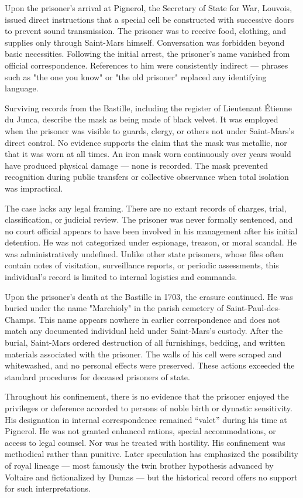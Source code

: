 Upon the prisoner's arrival at Pignerol, the Secretary of State for War, Louvois, issued direct instructions that a special cell be constructed with successive doors to prevent sound transmission. The prisoner was to receive food, clothing, and supplies only through Saint-Mars himself. Conversation was forbidden beyond basic necessities. Following the initial arrest, the prisoner's name vanished from official correspondence. References to him were consistently indirect — phrases such as "the one you know" or "the old prisoner" replaced any identifying language.

Surviving records from the Bastille, including the register of Lieutenant Étienne du Junca, describe the mask as being made of black velvet. It was employed when the prisoner was visible to guards, clergy, or others not under Saint-Mars's direct control. No evidence supports the claim that the mask was metallic, nor that it was worn at all times. An iron mask worn continuously over years would have produced physical damage — none is recorded. The mask prevented recognition during public transfers or collective observance when total isolation was impractical.

The case lacks any legal framing. There are no extant records of charges, trial, classification, or judicial review. The prisoner was never formally sentenced, and no court official appears to have been involved in his management after his initial detention. He was not categorized under espionage, treason, or moral scandal. He was administratively undefined. Unlike other state prisoners, whose files often contain notes of visitation, surveillance reports, or periodic assessments, this individual's record is limited to internal logistics and commands.

Upon the prisoner's death at the Bastille in 1703, the erasure continued. He was buried under the name "Marchioly" in the parish cemetery of Saint-Paul-des-Champs. This name appears nowhere in earlier correspondence and does not match any documented individual held under Saint-Mars's custody. After the burial, Saint-Mars ordered destruction of all furnishings, bedding, and written materials associated with the prisoner. The walls of his cell were scraped and whitewashed, and no personal effects were preserved. These actions exceeded the standard procedures for deceased prisoners of state. 

Throughout his confinement, there is no evidence that the prisoner enjoyed the privileges or deference accorded to persons of noble birth or dynastic sensitivity. His designation in internal correspondence remained “valet” during his time at Pignerol. He was not granted enhanced rations, special accommodations, or access to legal counsel. Nor was he treated with hostility. His confinement was methodical rather than punitive. Later speculation has emphasized the possibility of royal lineage — most famously the twin brother hypothesis advanced by Voltaire and fictionalized by Dumas — but the historical record offers no support for such interpretations.

